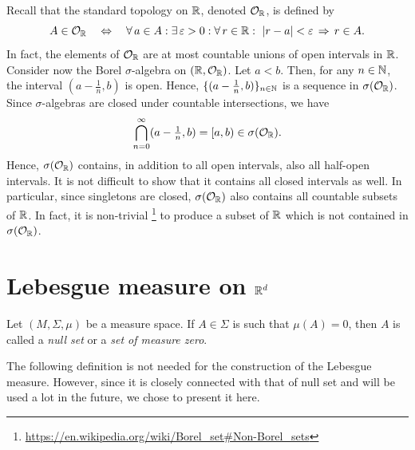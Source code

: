 \begin{example}
Recall that the standard topology on $\mathbb{R}$, denoted $\mathcal{O}_{\mathbb{R}}$, is defined by
\begin{equation*}
A\in \mathcal{O}_{\mathbb{R}} \quad \Leftrightarrow \quad \forall \, a\in A : \exists \, \varepsilon > 0 : \forall \, r \in \mathbb{R} : \ |r-a|<\varepsilon \, \Rightarrow\,  r\in A.
\end{equation*}
In fact, the elements of $\mathcal{O}_{\mathbb{R}}$ are at most countable unions of open intervals in $\mathbb{R}$. Consider now the Borel $\sigma$-algebra on $(\mathbb{R},\mathcal{O}_{\mathbb{R}})$. Let $a<b$. Then, for any $n\in \mathbb{N}$, the interval $(a-\tfrac{1}{n},b)$ is open. Hence, $\{(a-\tfrac{1}{n},b)\}_{n\in \mathbb{N}}$ is a sequence in $\sigma(\mathcal{O}_{\mathbb{R}})$. Since $\sigma$-algebras are closed under countable intersections, we have
\begin{equation*}
\bigcap_{n=0}^{\infty}(a-\tfrac{1}{n},b) = [a,b) \in \sigma(\mathcal{O}_{\mathbb{R}}).
\end{equation*}
Hence, $\sigma(\mathcal{O}_{\mathbb{R}})$ contains, in addition to all open
intervals, also all half-open intervals. It is not difficult to show
that it contains all closed intervals as well. In particular, since
singletons are closed, $\sigma(\mathcal{O}_{\mathbb{R}})$ also contains all
countable subsets of $\mathbb{R}$. In fact, it is non-trivial%
\footnote{\url{https://en.wikipedia.org/wiki/Borel_set\#Non-Borel_sets}}
to produce a subset of $\mathbb{R}$ which is not contained in
$\sigma(\mathcal{O}_{\mathbb{R}})$.
\end{example}

\section[\texorpdfstring{Lebesgue measure on $\R^d$}{Lebesgue measure on R\textasciicircum d}]{Lebesgue measure on $\R^d$}

\begin{definition}
Let $(M,\Sigma,\mu)$ be a measure space. If $A\in\Sigma$ is such that $\mu(A)=0$, then $A$ is called a \emph{null set} or a \emph{set of measure zero}. 
\end{definition}

The following definition is not needed for the construction of the Lebesgue measure. However, since it is closely connected with that of null set and will be used a lot in the future, we chose to present it here.

